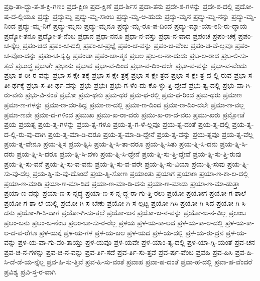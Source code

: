 {ಪ್ರಥಿ-ತಾ-ದ್ಭು-ತ-ಶ-ಕ್ತಿ-ಗಣಂ
ಪ್ರದ-ಕ್ಷಿಣ
ಪ್ರದ-ಕ್ಷಿಣೆ
ಪ್ರದ-ರ್ಶಿಸ
ಪ್ರದಾ-ತನು
ಪ್ರದೇ-ಶ-ಗಳನ್ನು
ಪ್ರದೇ-ಶ-ದಲ್ಲಿ
ಪ್ರದೋ-ಷ-ದ-ಲ್ಲಿಯೂ
ಪ್ರದ್ಯು
ಪ್ರದ್ಯುಮ್ನ
ಪ್ರದ್ಯು-ಮ್ನ-ಸಾಂಬ
ಪ್ರದ್ಯು-ಮ್ನ-ಅ-ಹುದು
ಪ್ರದ್ಯು-ಮ್ನನ
ಪ್ರದ್ಯು-ಮ್ನ-ನನ್ನು
ಪ್ರದ್ಯು-ಮ್ನ-ನಿಂದ
ಪ್ರದ್ಯು-ಮ್ನ-ನಿಗೆ
ಪ್ರದ್ಯು-ಮ್ನನು
ಪ್ರದ್ಯು-ಮ್ನನೂ
ಪ್ರದ್ಯು-ಮ್ನ-ರೂ-ಪ-ದಿಂದ
ಪ್ರದ್ಯು-ಮ್ನಾ-ಯಾ-ಽನಿ-ರು-ದ್ಧಾಯ
ಪ್ರದ್ಯೋ-ತನೂ
ಪ್ರದ್ಯೋ-ತ-ನೆಂಬ
ಪ್ರಧಾನ
ಪ್ರಧಾ-ನನೂ
ಪ್ರಧಾ-ನ-ವಸ್ತು
ಪ್ರಧಾ-ನ-ವಾದ
ಪ್ರಪಂಚ
ಪ್ರಪಂ-ಚಕ್ಕೆ
ಪ್ರಪಂ-ಚ-ಕ್ಕೆಲ್ಲ
ಪ್ರಪಂ-ಚದ
ಪ್ರಪಂ-ಚ-ದಲ್ಲಿ
ಪ್ರಪಂ-ಚ-ಪ್ರಜ್ಞೆ
ಪ್ರಪಂ-ಚ-ವನ್ನು
ಪ್ರಪಂ-ಚ-ವೆಂಬ
ಪ್ರಪಂ-ಚ-ವೆ-ಲ್ಲವೂ
ಪ್ರಪಂ-ಚ-ವೊಂ-ದನ್ನು
ಪ್ರಪಂ-ಚ-ಸೃಷ್ಟಿ
ಪ್ರಪಂಚಾ
ಪ್ರಪಂ-ಚಾ-ತ್ಮಕ
ಪ್ರಬಲ
ಪ್ರಬ-ಲ-ನಾ-ದುದು
ಪ್ರಬ-ಲ-ರಾದ
ಪ್ರಬ-ಲಿ-ಸು-ತ್ತದೆ
ಪ್ರಬುದ್ಧ
ಪ್ರಭಾತೇ
ಪ್ರಭಾನು
ಪ್ರಭಾವ
ಪ್ರಭಾ-ವ-ದಿಂದ
ಪ್ರಭಾ-ವ-ದಿಂ-ದಲೇ
ಪ್ರಭಾ-ವ-ವನ್ನು
ಪ್ರಭಾ-ವ-ವೆಂದು
ಪ್ರಭಾ-ಶ-ರೀ-ರ-ವನ್ನು
ಪ್ರಭಾ-ಸ-ಕ್ಷೇ-ತಕ್ಕೆ
ಪ್ರಭಾ-ಸ-ಕ್ಷೇ-ತ್ರಕ್ಕೆ
ಪ್ರಭಾ-ಸ-ಕ್ಷೇ-ತ್ರದ
ಪ್ರಭಾ-ಸ-ಕ್ಷೇ-ತ್ರ-ದ-ಲ್ಲಿ-ರುವ
ಪ್ರಭಾ-ಸ-ತೀ-ರ್ಥಕ್ಕೆ
ಪ್ರಭಾ-ಸ-ತೀ-ರ್ಥ-ವನ್ನು
ಪ್ರಭು
ಪ್ರಭುಃ
ಪ್ರಭು-ಗ-ಳೆಂ-ದು-ಕೊ-ಳ್ಳು-ತ್ತಿ-ದ್ದೇವೆ
ಪ್ರಭು-ತ್ವ-ದಲ್ಲಿ
ಪ್ರಭು-ವಾ-ಗಿ-ರು-ವನು
ಪ್ರಭು-ವಿ-ನಂತೆ
ಪ್ರಭೋ
ಪ್ರಮ-ಥನು
ಪ್ರಮ-ಥರ
ಪ್ರಮ-ಥ-ರಲ್ಲಿ
ಪ್ರಮ-ಥ-ರಿಂದ
ಪ್ರಮ-ಥರು
ಪ್ರಮಾಣ
ಪ್ರಮಾ-ಣ-ಗಳನ್ನು
ಪ್ರಮಾ-ಣ-ದಂ-ತಿದ್ದ
ಪ್ರಮಾ-ಣ-ದಲ್ಲಿ
ಪ್ರಮಾ-ಣ-ದಿಂದ
ಪ್ರಮಾ-ಣ-ದಿಂ-ದಲೇ
ಪ್ರಮಾ-ಣ-ವಲ್ಲ
ಪ್ರಮಾ-ಣವೇ
ಪ್ರಮಾ-ದ-ಗಳಿಂದ
ಪ್ರಮುಖ
ಪ್ರಮು-ಖ-ರಾ-ದರು
ಪ್ರಮು-ಖ-ರಾ-ದ-ವರು
ಪ್ರಮು-ಖರು
ಪ್ರಮ್ಲೋಚೆ
ಪ್ರಯ
ಪ್ರಯತ್ನ
ಪ್ರಯ-ತ್ನ-ಗಳನ್ನು
ಪ್ರಯ-ತ್ನ-ಗಳೂ
ಪ್ರಯ-ತ್ನ-ಗ-ಳೆ-ಲ್ಲವೂ
ಪ್ರಯ-ತ್ನ-ದಂತೆ
ಪ್ರಯ-ತ್ನ-ದಲ್ಲಿ
ಪ್ರಯ-ತ್ನ-ದ-ಲ್ಲಿ-ರು-ವು-ದಾಗಿ
ಪ್ರಯ-ತ್ನ-ಮಾ-ಡಿ-ದರೂ
ಪ್ರಯ-ತ್ನ-ಮಾ-ಡಿ-ದ್ದೇನೆ
ಪ್ರಯ-ತ್ನ-ವನ್ನು
ಪ್ರಯ-ತ್ನವೂ
ಪ್ರಯ-ತ್ನ-ವೆಲ್ಲ
ಪ್ರಯ-ತ್ನ-ವೇನೂ
ಪ್ರಯ-ತ್ನಿಸ
ಪ್ರಯ-ತ್ನಿಸಿ
ಪ್ರಯ-ತ್ನಿ-ಸಿ-ತಾ-ದರೂ
ಪ್ರಯ-ತ್ನಿ-ಸಿತು
ಪ್ರಯ-ತ್ನಿ-ಸಿ-ದನು
ಪ್ರಯ-ತ್ನಿ-ಸಿ-ದರು
ಪ್ರಯ-ತ್ನಿ-ಸಿ-ದರೂ
ಪ್ರಯ-ತ್ನಿ-ಸಿ-ದಳು
ಪ್ರಯ-ತ್ನಿ-ಸಿ-ದ್ದೇನೆ
ಪ್ರಯ-ತ್ನಿ-ಸು-ತ್ತಿ-ದ್ದೇವೆ
ಪ್ರಯ-ತ್ನಿ-ಸು-ತ್ತಿ-ರುವು
ಪ್ರಯ-ತ್ನಿ-ಸು-ವನೆ
ಪ್ರಯ-ತ್ನಿ-ಸು-ವ-ವನು
ಪ್ರಯ-ತ್ನಿ-ಸು-ವ-ವರೇ
ಪ್ರಯ-ತ್ನಿ-ಸು-ವಿಯಾ
ಪ್ರಯ-ತ್ನಿ-ಸುವು
ಪ್ರಯ-ತ್ನಿ-ಸು-ವು-ದೆಲ್ಲ
ಪ್ರಯ-ತ್ನಿ-ಸು-ವು-ದೊಂದೆ
ಪ್ರಯ-ತ್ನಿ-ಸೋಣ
ಪ್ರಯಾಂತು
ಪ್ರಯಾಗ
ಪ್ರಯಾಣ
ಪ್ರಯಾ-ಣ-ಕಾ-ಲ-ದಲ್ಲಿ
ಪ್ರಯಾ-ಣ-ಮಾಡಿ
ಪ್ರಯಾ-ಣ-ಮಾ-ಡಿದ
ಪ್ರಯಾ-ಣ-ಮಾ-ಡಿ-ದನು
ಪ್ರಯಾ-ಣ-ಮಾಡು
ಪ್ರಯಾ-ಣ-ಮಾ-ಡುತ್ತಾ
ಪ್ರಯಾ-ಣ-ವನ್ನು
ಪ್ರಯಾ-ಣ-ಸ-ನ್ನದ್ಧ
ಪ್ರಯಾ-ಣ-ಸ-ನ್ನ-ದ್ಧ-ರಾ-ಗು-ತ್ತಿ-ರಲು
ಪ್ರಯೋ
ಪ್ರಯೋಗ
ಪ್ರಯೋ-ಗ-ಶಾಲೆ
ಪ್ರಯೋ-ಗ-ಶಾ-ಲೆ-ಯಲ್ಲಿ
ಪ್ರಯೋ-ಗಿ-ಸ-ಬೇಕು
ಪ್ರಯೋ-ಗಿ-ಸ-ಲ್ಪಟ್ಟ
ಪ್ರಯೋ-ಗಿಸಿ
ಪ್ರಯೋ-ಗಿ-ಸಿದ
ಪ್ರಯೋ-ಗಿ-ಸಿ-ದನು
ಪ್ರಯೋ-ಗಿ-ಸಿ-ದಾಗ
ಪ್ರಯೋ-ಗಿ-ಸು-ತ್ತಲೆ
ಪ್ರಯೋ-ಜನ
ಪ್ರಯೋ-ಜ-ನ-ವನ್ನು
ಪ್ರಯೋ-ಜ-ನ-ವಿಲ್ಲ
ಪ್ರಲಂಬ
ಪ್ರಲಂ-ಬನು
ಪ್ರಲಂ-ಬ-ನೆಂಬ
ಪ್ರಲಂ-ಬಾ-ಸು-ರ-ರೆಲ್ಲ
ಪ್ರಳಯ
ಪ್ರಳ-ಯ-ಕಾ-ಲದ
ಪ್ರಳ-ಯ-ಕಾ-ಲ-ದಲ್ಲಿ
ಪ್ರಳ-ಯ-ಕಾ-ಲ-ದ-ವ-ರೆಗೂ
ಪ್ರಳ-ಯಕ್ಕೆ
ಪ್ರಳ-ಯ-ಗಳ
ಪ್ರಳ-ಯ-ಜಲ
ಪ್ರಳ-ಯದ
ಪ್ರಳ-ಯ-ದಲ್ಲಿ
ಪ್ರಳ-ಯ-ರು-ದ್ರನ
ಪ್ರಳ-ಯ-ವನ್ನು
ಪ್ರಳ-ಯ-ವಾ-ಗು-ವಂ-ತಾಯ್ತು
ಪ್ರಳ-ಯವೂ
ಪ್ರಳ-ಯವೇ
ಪ್ರಳ-ಯಾಂ-ತ್ಯ-ದಲ್ಲಿ
ಪ್ರಳ-ಯಾ-ಗ್ನಿ-ಯಂತೆ
ಪ್ರವ-ಚನ
ಪ್ರವ-ಚ-ನ-ಗಳನ್ನು
ಪ್ರವ-ಚ-ನ-ವನ್ನು
ಪ್ರವ-ರ್ತಿ-ಸದೆ
ಪ್ರವ-ರ್ತಿ-ಸು-ತ್ತವೆ
ಪ್ರವ-ರ್ಷ-ವೆಂಬ
ಪ್ರವಹಿ
ಪ್ರವ-ಹಿಸಿ
ಪ್ರವ-ಹಿ-ಸಿ-ದೆ-ಡೆ-ಯ-ನ್ನೆಲ್ಲ
ಪ್ರವ-ಹಿ-ಸು-ತ್ತಿವೆ
ಪ್ರವ-ಹಿ-ಸು-ವಂತೆ
ಪ್ರವಾಹ
ಪ್ರವಾ-ಹ-ದಂತೆ
ಪ್ರವಾ-ಹ-ದಲ್ಲಿ
ಪ್ರವಾ-ಹ-ವೆಂದರೆ
ಪ್ರವಿಶ್ಯ
ಪ್ರವಿ-ಸ್ತ-ರ-ವಾಗಿ
}
